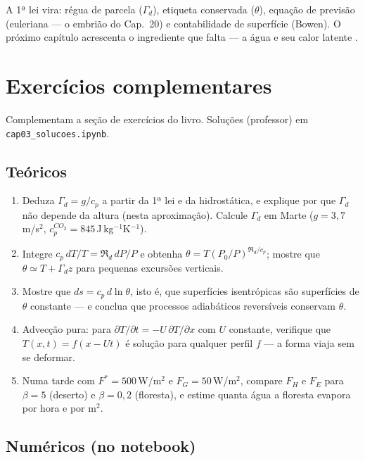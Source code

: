 \documentclass[11pt]{article}
\begin{document}
A 1ª lei vira: régua de parcela ($\Gamma_d$), etiqueta conservada
($\theta$), equação de previsão (euleriana — o embrião do Cap.~20) e
contabilidade de superfície (Bowen). O próximo capítulo acrescenta o
ingrediente que falta — a água e seu calor latente
.

\section{Exercícios complementares}\label{sec:exercicios}

Complementam a seção de exercícios do livro. Soluções (professor) em
\texttt{cap03\_solucoes.ipynb}.

\subsection*{Teóricos}

\begin{enumerate}[label=\textbf{T\arabic*.},itemsep=4pt]
  \item Deduza $\Gamma_d = g/c_p$ a partir da 1ª lei e da hidrostática, e
        explique por que $\Gamma_d$ não depende da altura (nesta
        aproximação). Calcule $\Gamma_d$ em Marte
        ($g = 3{,}7$\,m/s$^2$, $c_p^{CO_2} = 845$\,J\,kg$^{-1}$K$^{-1}$).
  \item Integre $c_p\,dT/T = \Re_d\,dP/P$ e obtenha
        $\theta = T(P_0/P)^{\Re_d/c_p}$; mostre que
        $\theta \simeq T + \Gamma_d z$ para pequenas excursões verticais.
  \item Mostre que $ds = c_p\,d\ln\theta$, isto é, que superfícies
        isentrópicas são superfícies de $\theta$ constante — e conclua que
        processos adiabáticos reversíveis conservam $\theta$.
  \item Advecção pura: para
        $\partial T/\partial t = -U\,\partial T/\partial x$ com $U$
        constante, verifique que $T(x,t) = f(x-Ut)$ é solução para
        qualquer perfil $f$ — a forma viaja sem se deformar.
  \item Numa tarde com $F^* = 500$\,W/m$^2$ e $F_G = 50$\,W/m$^2$, compare
        $F_H$ e $F_E$ para $\beta = 5$ (deserto) e $\beta = 0{,}2$
        (floresta), e estime quanta água a floresta evapora por hora e
        por m$^2$.
\end{enumerate}

\subsection*{Numéricos (no notebook)}
\end{document}

